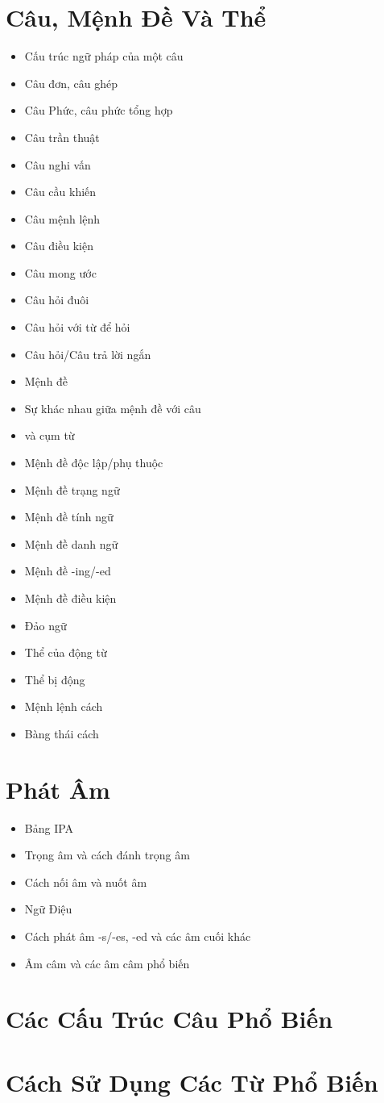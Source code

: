 \begin{multicols}{2}
\chapter{Câu, Mệnh Đề Và Thể}
\begin{itemize}
    \item Cấu trúc ngữ pháp của một câu
    \item Câu đơn, câu ghép
    \item Câu Phức, câu phức tổng hợp
    \item Câu trần thuật
    \item Câu nghi vấn
    \item Câu cầu khiến
    \item Câu mệnh lệnh
    \item Câu điều kiện
    \item Câu mong ước
    \item Câu hỏi đuôi
    \item Câu hỏi với từ để hỏi
    \item Câu hỏi/Câu trả lời ngắn
    \item Mệnh đề
    \item Sự khác nhau giữa mệnh đề với câu   
    \item và cụm từ
    \item Mệnh đề độc lập/phụ thuộc
    \item Mệnh đề trạng ngữ
    \item Mệnh đề tính ngữ
    \item Mệnh đề danh ngữ
    \item Mệnh đề -ing/-ed
    \item Mệnh đề điều kiện
    \item Đảo ngữ
    \item Thể của động từ
    \item Thể bị động
    \item Mệnh lệnh cách
    \item Bàng thái cách
\end{itemize}

\chapter{Phát Âm}
\begin{itemize}
    \item Bảng IPA
    \item Trọng âm và cách đánh trọng âm
    \item Cách nối âm và nuốt âm
    \item Ngữ Điệu
    \item Cách phát âm -s/-es, -ed và các âm cuối khác
    \item Âm câm và các âm câm phổ biến
\end{itemize}

\chapter{Các Cấu Trúc Câu Phổ Biến}
\chapter{Cách Sử Dụng Các Từ Phổ Biến}
\end{multicols}
